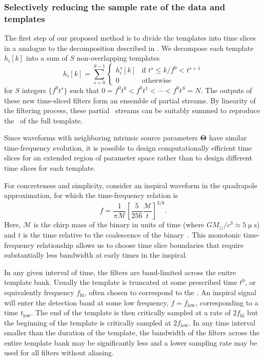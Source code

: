 \subsubsection{Selectively reducing the sample rate of the data and templates}
\label{sec:time-slices}

The first step of our proposed method is to divide the templates into time
slices in a \TD{} analogue to the \FD{} decomposition described
in \citet{Marion2004, Buskulic2010}.  We decompose each template
$h_{i}[k]$ into a sum of $S$ non-overlapping templates
%
\begin{equation}
\label{eq:time-slices}
h_{i}[k] = \sum_{s=0}^{S-1}
	\begin{cases}
		h_i^s[k] & \textrm{if } t^s \leqslant k / f^0 < t^{s+1} \\
		0 & \textrm{otherwise}
	\end{cases}
\end{equation}
%
for $S$ integers $\{f^0 t^s\}$ such that $0  = f^0 t^0 < f^0 t^1 < \cdots < f^0
t^S = N$.  The outputs of these new time-sliced filters
form an ensemble of partial \SNR{} streams.  By linearity of the filtering
process, these partial \SNR\ streams can be suitably summed to reproduce the
\SNR\ of the full template.

Since waveforms with neighboring intrinsic source parameters $\mathbf\Theta$
 have similar time-frequency evolution, it is possible to design computationally
efficient time slices for an extended region of parameter space rather than to
design different time slices for each template.

For concreteness and simplicity, consider an inspiral waveform in the
quadrapole approximation, for which the time-frequency relation is
%
\begin{equation} \label{eq:fgw}
%
f = \frac{1}{\mathcal{\pi M}} \left[ \frac{5}{256}\frac{\mathcal{M}}{t}
\right]^{3/8}.
%
\end{equation}
%
Here, $\mathcal{M}$ is the chirp mass of the binary in units of time (where $G
M_\odot / c^3 \approx 5 \upmu\mathrm{s}$) and $t$ is the time relative to the
coalescence of the binary~\citep{findchirppaper, kidder1992}.
This monotonic time-frequency relationship allows us
to choose time slice boundaries that require substantially less bandwidth at
early times in the inspiral.

In any given interval of time, the filters are band-limited across the enitre
template bank. Usually the template is truncated at some prescribed time $t^0$,
or equivalently frequency $f_\mathrm{hi}$, often chosen to correspond to the
\ISCO. An inspiral signal will enter the detection band at some low frequency,
$f = f_\mathrm{low}$, corresponding to a time $t_\mathrm{low}$.  The end of the
template is then critically sampled at a rate of $2 f_\mathrm{hi}$ but the 
beginning of the template is critically sampled at $2 f_\mathrm{low}$. In any
time interval smaller than the duration of the template, the bandwidth of the
filters across the entire template bank may be significantly less and
a lower sampling rate may be used for all filters without aliasing.

